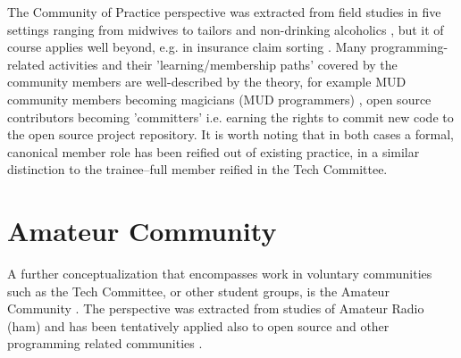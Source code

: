 \documentclass{sig-alt-release2}
\begin{document}
The Community of Practice perspective was extracted from field studies in five settings ranging from midwives to tailors and non-drinking alcoholics \cite{lave_wenger91}, but it of course applies well beyond, e.g. in insurance claim sorting \cite{wenger98}. Many programming-related activities and their 'learning/membership paths' covered by the community members are well-described by the theory, for example MUD community members becoming magicians (MUD programmers) \cite{pargman00, pargman05}, open source contributors becoming 'committers' i.e. earning the rights to commit new code to the open source project repository. It is worth noting that in both cases a formal, canonical member role has been reified out of existing practice, in a similar distinction to the trainee--full member reified in the Tech Committee.

\section{Amateur Community}\label{sec:amateur}
A further conceptualization that encompasses work in voluntary communities such as the Tech Committee, or other student groups, is the Amateur Community \cite{bogdan03, bogdan_bowers07}. The perspective was extracted from studies of Amateur Radio (ham) \cite{bogdan_bowers07} and has been tentatively applied also to open source and other programming related communities \cite{bogdan03}. 
\end{document}
